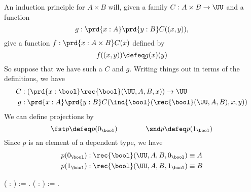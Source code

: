     An induction principle for $A \times B$ will, given a family $C : A \times B
    \to \UU$ and a function 
    \[
    g : \prd{x:A}\prd{y:B} C((x, y)),
    \] 
    give a function $f : \prd{x : A \times B}C(x)$ defined by
    \[
    f((x, y)) \defeq g(x)(y)
    \]
    So suppose that we have such a $C$ and $g$.  Writing things out in terms of the
    definitions, we have
    \begin{align*}
    C &: \left(\prd{x:\bool}\rec{\bool}(\UU, A, B, x)\right) \to \UU \\
    g &: \prd{x:A}\prd{y:B} C(\ind{\bool}(\rec{\bool}(\UU, A, B), x, y))
    \end{align*}  
    We can define projections by
    \[
    \fst p \defeq p(0_{\bool}) \qquad\qquad \snd p \defeq p(1_{\bool})
    \]
    Since $p$ is an element of a dependent type, we have
    \begin{align*}
    p(0_{\bool}) &: \rec{\bool}(\UU, A, B, 0_{\bool}) \equiv A\\
    p(1_{\bool}) &: \rec{\bool}(\UU, A, B, 1_{\bool}) \equiv B
    \end{align*} \begin{coqdoccode}
\coqdocemptyline
\coqdocindent{1.00em}
  ( : ) :=  .\coqdoceol
\coqdocemptyline
\coqdocindent{1.00em}
  ( : ) :=  .\coqdoceol
\coqdocemptyline
\end{coqdoccode}


